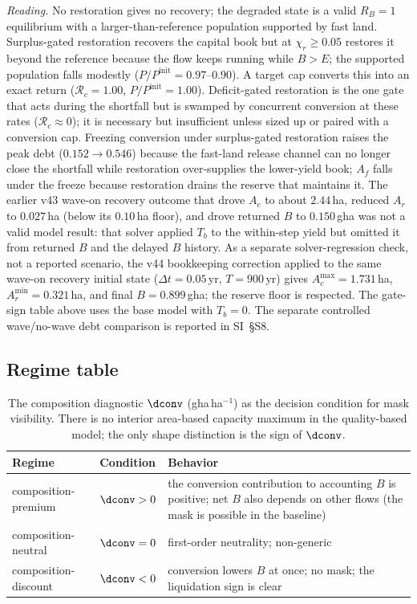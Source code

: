 \noindent\emph{Reading.} No restoration gives no recovery; the degraded state is a valid $R_B=1$ equilibrium with a larger-than-reference population supported by fast land. Surplus-gated restoration recovers the capital book but at $\chi_r\ge0.05$ restores it beyond the reference because the flow keeps running while $B>E$; the supported population falls modestly ($P/P^{\mathrm{init}}=0.97$--$0.90$). A target cap converts this into an exact return ($\mathcal R_c=1.00$, $P/P^{\mathrm{init}}=1.00$). Deficit-gated restoration is the one gate that acts during the shortfall but is swamped by concurrent conversion at these rates ($\mathcal R_c\approx0$); it is necessary but insufficient unless sized up or paired with a conversion cap. Freezing conversion under surplus-gated restoration raises the peak debt ($0.152\to0.546$) because the fast-land release channel can no longer close the shortfall while restoration over-supplies the lower-yield book; $A_f$ falls under the freeze because restoration drains the reserve that maintains it. The earlier v43 wave-on recovery outcome that drove $A_c$ to about $2.44$\,ha, reduced $A_r$ to $0.027$\,ha (below its $0.10$\,ha floor), and drove returned $B$ to $0.150$\,gha was not a valid model result: that solver applied $T_b$ to the within-step yield but omitted it from returned $B$ and the delayed $B$ history. As a separate solver-regression check, not a reported scenario, the v44 bookkeeping correction applied to the same wave-on recovery initial state ($\Delta t=0.05$\,yr, $T=900$\,yr) gives $A_c^{\max}=1.731$\,ha, $A_r^{\min}=0.321$\,ha, and final $B=0.899$\,gha; the reserve floor is respected. The gate-sign table above uses the base model with $T_b=0$. The separate controlled wave/no-wave debt comparison is reported in SI~\S S8.

\subsection{Regime table}\label{si:regimes}

\begin{table}[H]
\centering\small
\caption{The composition diagnostic $\dconv$ (gha\,ha$^{-1}$) as the decision condition for mask visibility. There is no interior area-based capacity maximum in the quality-based model; the only shape distinction is the sign of $\dconv$.}
\label{tab:si_regime}
\begin{tabularx}{\textwidth}{l l X}
\toprule
Regime & Condition & Behavior \\
\midrule
composition-premium & $\dconv>0$ & the conversion contribution to accounting $B$ is positive; net $B$ also depends on other flows (the mask is possible in the baseline) \\
composition-neutral & $\dconv=0$ & first-order neutrality; non-generic \\
composition-discount & $\dconv<0$ & conversion lowers $B$ at once; no mask; the liquidation sign is clear \\
\bottomrule
\end{tabularx}
\end{table}

